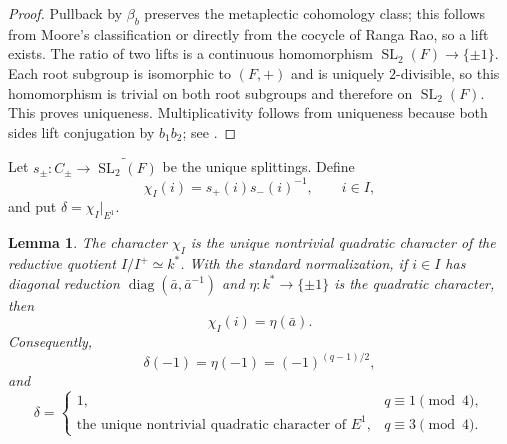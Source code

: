\documentclass[11pt,a4paper,twoside]{amsart}
\newtheorem{lemma}[theorem]{Lemma}
\theoremstyle{definition}
\theoremstyle{remark}
\newcommand{\SL}{\operatorname{SL}}
\begin{document}
\begin{proof}
Pullback by $\beta_b$ preserves the metaplectic cohomology class; this follows from Moore's classification or directly from the cocycle of Ranga Rao, so a lift exists. The ratio of two lifts is a continuous homomorphism $\SL_2(F)\to\{\pm1\}$. Each root subgroup is isomorphic to $(F,+)$ and is uniquely $2$-divisible, so this homomorphism is trivial on both root subgroups and therefore on $\SL_2(F)$. This proves uniqueness. Multiplicativity follows from uniqueness because both sides lift conjugation by $b_1b_2$; see \cite{Moore,RangaRao,Roberts}.
\end{proof}
Let $s_\pm:C_\pm\to\widetilde{\SL_2(F)}$ be the unique splittings. Define
$$
\chi_I(i)=s_+(i)s_-(i)^{-1},\qquad i\in I,
$$
and put $\delta=\chi_I|_{E^1}$.
\begin{lemma}\label{ex}
The character $\chi_I$ is the unique nontrivial quadratic character of the reductive quotient $I/I^+\simeq k^*$. With the standard normalization, if $i\in I$ has diagonal reduction $\operatorname{diag}(\bar a,\bar a^{-1})$ and $\eta:k^*\to\{\pm1\}$ is the quadratic character, then
$$
\chi_I(i)=\eta(\bar a).
$$
Consequently,
$$
\delta(-1)=\eta(-1)=(-1)^{(q-1)/2},
$$
and
$$
\delta=\begin{cases}
1,&q\equiv1\pmod4,\\
\text{the unique nontrivial quadratic character of }E^1,&q\equiv3\pmod4.
\end{cases}
$$
\end{lemma}
\end{document}
